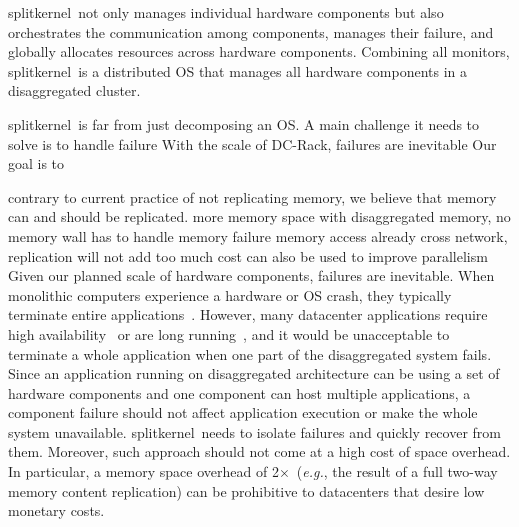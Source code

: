 \documentclass[10pt,times,twocolumn]{z2-article}
\newcommand{\x}{$\times$}
\newcommand{\eg}{\textit{e.g.}}
\newcommand{\splitkernel}{splitkernel}
\newcommand{\dcrack}{DC-Rack}
\newcommand{\microos}{monitor}
\begin{document}
{\splitkernel\ not only manages individual hardware components but also orchestrates the communication
among components, manages their failure, and globally allocates resources across hardware components.
Combining all \microos{}s, \splitkernel\ is a distributed OS that manages all hardware components in a disaggregated cluster.
\fi







\splitkernel\ is far from just decomposing an OS. 
A main challenge it needs to solve is to handle failure 
With the scale of \dcrack, failures are inevitable
Our goal is to 

contrary to current practice of not replicating memory, we believe that memory can and should be replicated. 
more memory space with disaggregated memory, no memory wall
has to handle memory failure
memory access already cross network, replication will not add too much cost
can also be used to improve parallelism
Given our planned scale of hardware components, failures are inevitable.
When monolithic computers experience a hardware or OS crash, they typically terminate entire applications~\cite{Depoutovitch10-otherworld}.
However, many datacenter applications require high availability~\cite{MongoDB} or are long running~\cite{TensorFlow},
and it would be unacceptable to terminate a whole application when one part of the disaggregated system fails.
Since an application running on disaggregated architecture
can be using a set of hardware components and one component can host multiple applications, 
a component failure should not affect application execution or make the whole system unavailable.
\splitkernel\ needs to isolate failures and quickly recover from them. %
Moreover, such approach should not come at a high cost of space overhead.
In particular, a memory space overhead of 2\x\ (\eg, the result of a full two-way memory content replication) 
can be prohibitive to datacenters that desire low monetary costs.
\fi

}
\end{document}
